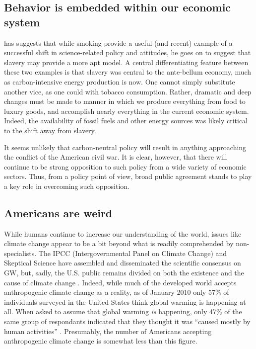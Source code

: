 \subsection{Behavior is embedded within our economic system}

\textcite{hoffman_climate_2010} has suggests that while smoking provide a useful
(and recent) example of a successful shift in science-related policy and
attitudes, he goes on to suggest that slavery may provide a more apt model. A
central differentiating feature between these two examples is that slavery was
central to the ante-bellum economy, much as carbon-intensive energy production
is now.  One cannot simply substitute another vice, as one could with tobacco
consumption.  Rather, dramatic and deep changes must be made to manner in which
we produce everything from food to luxury goods, and accomplish nearly
everything in the current economic system. Indeed, the availability of fossil
fuels and other energy sources was likely critical to the shift away from
slavery.

It seems unlikely that carbon-neutral policy will result in anything approaching
the conflict of the American civil war. It is clear, however, that there will
continue to be strong opposition to such policy from a wide variety of economic
sectors. Thus, from a policy point of view, broad public agreement stands to
play a key role in overcoming such opposition.

\subsection{Americans are weird}

While humans continue to increase our understanding of the world, issues like
climate change appear to be a bit beyond what is readily comprehended by
non-specialists. The IPCC (Intergovernmental Panel on Climate Change) and Skeptical Science have
assembled and disseminated the scientific consensus on GW, but, sadly, the U.S.
public remains divided on both the existence and the cause of climate change
\parencite[cf.][]{hoffman_growing_2011}. Indeed, while much of the
developed world accepts anthropogenic climate change as a reality, as of January
2010 only 57\% of individuals surveyed in the United States think global warming
is happening at all. When asked to assume that global warming \emph{is}
happening, only 47\% of the same group of respondants indicated that they
thought it was ``caused mostly by human activities'' \cite[Q47 and Q50
in][]{leiserowitz_climate_2010}.  Presumably, the number of Americans accepting
anthropogenic climate change is somewhat less than this figure. 

